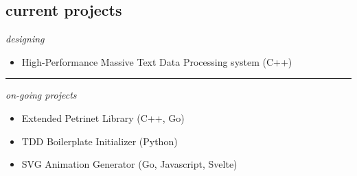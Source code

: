 \documentclass[12pt]{res}
\begin{document}
\begin{resume}
\begin{minipage}[t]{0.4\linewidth}
	\section{current projects}
	\footnotesize{
		\begin{minipage}[t]{1.0\linewidth}
			\raggedright{\emph{designing}}
		\end{minipage}
		\begin{minipage}[t]{1.0\linewidth}
			\vspace{5pt}
			\begin{flushleft}
				\begin{itemize}
					\item High-Performance Massive Text Data Processing system (C++)
				\end{itemize}
			\end{flushleft}
			\vspace{5pt}
		\end{minipage}
		\rule{1.0\textwidth}{0.1pt}

		\begin{minipage}[t]{1.0\linewidth}
			\vspace{5pt}
			\raggedright{\emph{on-going projects}}
		\end{minipage}
		\begin{minipage}[t]{1.0\linewidth}
			\vspace{5pt}
			\begin{flushleft}
				\begin{itemize}
					\item Extended Petrinet Library (C++, Go)
					\item TDD Boilerplate Initializer (Python)
					\item SVG Animation Generator (Go, Javascript, Svelte)
				\end{itemize}
			\end{flushleft}
			\vspace{5pt}
		\end{minipage}
	}
\end{minipage}

\end{resume} 
\end{document}
